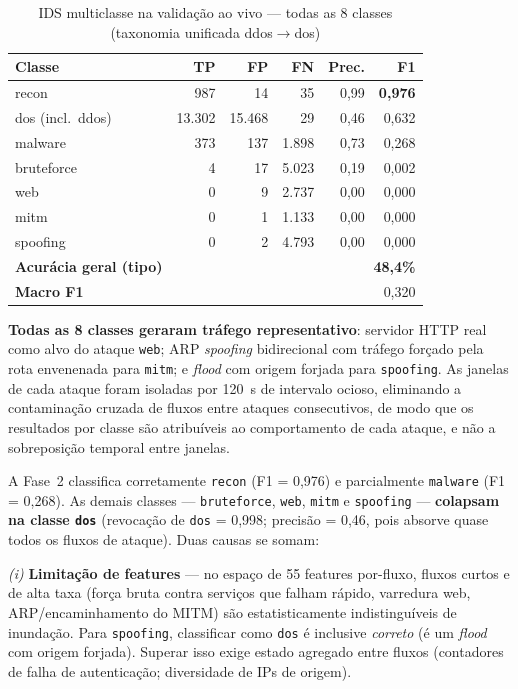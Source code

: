 \documentclass[12pt]{article}
\begin{document}
\begin{table}[ht]
\centering
\caption{IDS multiclasse na validação ao vivo — todas as 8 classes (taxonomia unificada ddos$\rightarrow$dos)}
\label{tab:multi_metrics}
\begin{tabular}{@{}lrrrrr@{}}
\toprule
\textbf{Classe} & \textbf{TP} & \textbf{FP} & \textbf{FN} & \textbf{Prec.} & \textbf{F1} \\ \midrule
recon             &    987 &     14 &     35 & 0,99 & \textbf{0,976} \\
dos (incl.\ ddos) & 13.302 & 15.468 &     29 & 0,46 & 0,632 \\
malware           &    373 &    137 &  1.898 & 0,73 & 0,268 \\
bruteforce        &      4 &     17 &  5.023 & 0,19 & 0,002 \\
web               &      0 &      9 &  2.737 & 0,00 & 0,000 \\
mitm              &      0 &      1 &  1.133 & 0,00 & 0,000 \\
spoofing          &      0 &      2 &  4.793 & 0,00 & 0,000 \\ \midrule
\textbf{Acurácia geral (tipo)} & \multicolumn{5}{r}{\textbf{48,4\%}} \\
\textbf{Macro F1} & \multicolumn{5}{r}{0,320} \\
\bottomrule
\end{tabular}
\end{table}

\textbf{Todas as 8 classes geraram tráfego representativo}: servidor HTTP real
como alvo do ataque \texttt{web}; ARP \textit{spoofing} bidirecional com tráfego
forçado pela rota envenenada para \texttt{mitm}; e \textit{flood} com origem
forjada para \texttt{spoofing}. As janelas de cada ataque foram isoladas por
120~s de intervalo ocioso, eliminando a contaminação cruzada de fluxos entre
ataques consecutivos, de modo que os resultados por classe são atribuíveis ao
comportamento de cada ataque, e não a sobreposição temporal entre janelas.

A Fase~2 classifica corretamente \texttt{recon} (F1 = 0,976) e parcialmente
\texttt{malware} (F1 = 0,268). As demais classes — \texttt{bruteforce},
\texttt{web}, \texttt{mitm} e \texttt{spoofing} — \textbf{colapsam na classe
\texttt{dos}} (revocação de \texttt{dos} = 0,998; precisão = 0,46, pois absorve
quase todos os fluxos de ataque). Duas causas se somam:

\textit{(i)} \textbf{Limitação de features} — no espaço de 55 features
por-fluxo, fluxos curtos e de alta taxa (força bruta contra serviços que falham
rápido, varredura web, ARP/encaminhamento do MITM) são estatisticamente
indistinguíveis de inundação. Para \texttt{spoofing}, classificar como
\texttt{dos} é inclusive \textit{correto} (é um \textit{flood} com origem
forjada). Superar isso exige estado agregado entre fluxos (contadores de falha
de autenticação; diversidade de IPs de origem).
\end{document}
